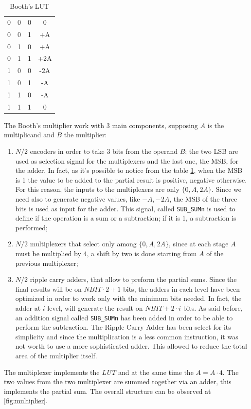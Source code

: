 \begin{table}[H]
	\begin{center}
		\begin{tabular}{ c c c | c}
			0 & 0 & 0 & 0\\ 
			0 & 0 & 1 & +A\\ 
			0 & 1 & 0 & +A\\ 
			0 & 1 & 1 & +2A\\ 
			1 & 0 & 0 & -2A\\ 
			1 & 0 & 1 & -A\\ 
			1 & 1 & 0 & -A\\ 
			1 & 1 & 1 & 0\\ 
		\end{tabular}
		\caption{Booth's LUT}
		\label{mult:lut}
	\end{center}
\end{table}

The Booth's multiplier work with 3 main components, supposing $A$ is the multiplicand and $B$ the multiplier:
\begin{enumerate}
	\item $N/2$ encoders in order to take 3 bits from the operand $B$; the two LSB are used as selection signal for the multiplexers and the last one, the MSB, for the adder. In fact, as it's possible to notice from the table \ref{mult:lut}, when the MSB is 1 the value to be added to the partial result is positive, negative otherwise. For this reason, the inputs to the multiplexers are only $\{0, A, 2A\}$. Since we need also to generate negative values, like ${-A, -2A}$, the MSB of the three bits is used as input for the adder. This signal, called \texttt{SUB\_SUMn} is used to define if the operation is a sum or a subtraction; if it is 1, a subtraction is performed;
	\item $N/2$ multiplexers that select only among $\{0, A, 2A\}$, since at each stage $A$ must be multiplied by 4, a shift by two is done starting from $A$ of the previous multiplexer;
	\item $N/2$ ripple carry adders, that allow to preform the partial sums. Since the final results will be on $NBIT \cdot 2+1$ bits, the adders in each level have been optimized in order to work only with the minimum bits needed. In fact, the adder at $i$ level, will generate the result on $NBIT + 2 \cdot i$ bits. As said before, an addition signal called \texttt{SUB\_SUMn} has been added in order to be able to perform the subtraction. The Ripple Carry Adder has been select for its simplicity and since the multiplication is a less common instruction, it was not worth to use a more sophisticated adder. This allowed to reduce the total area of the multiplier itself.
\end{enumerate}
The multiplexer implements the \textit{LUT} and at the same time the $A = A \cdot 4$. The two values from the two multiplexer are summed together via an adder, this implements the partial sum. The overall structure can be observed at \ref{fig:multiplier}.

